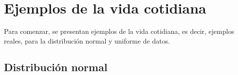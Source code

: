 \documentclass[10pt, a4paper,english,spanish,hidelinks]{article}
\begin{document}
\pagestyle{myheadings}
\maketitle
{}

\thispagestyle{empty}
\tableofcontents

\setcounter{section}{-1}

\newpage
\section{Ejemplos de la vida cotidiana}
Para comenzar, se presentan ejemplos de la vida cotidiana, es decir, ejemplos reales, para la distribución normal y uniforme de datos. 

\subsection{Distribución normal}
\end{document}
